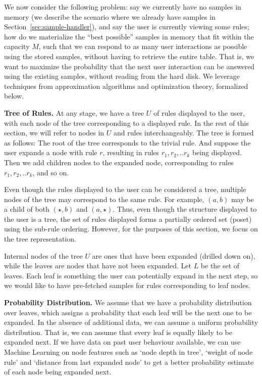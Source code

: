 \documentclass[10pt,journal,compsoc]{IEEEtran}
\newcounter{prob}
\newcommand{\stitle}[1]{\vspace{0.5em}\noindent\textbf{#1}}
\begin{document}
{We now consider the following problem: say we currently have no
samples in memory (we describe the scenario where we already have samples in Section~\ref{sec:sample-handler}), 
and say the user is currently viewing some rules; how do we
materialize the ``best possible'' samples in memory that fit within the capacity $M$,
such that we can respond to as many user interactions as possible using the stored samples,
without having to retrieve the entire table.
That is, we want to maximize the probability that the next user interaction
can be answered using the existing samples, without reading from the hard disk. 
We leverage techniques from approximation algorithms and optimization theory, formalized
below.


\stitle{Tree of Rules.}
At any stage, we have a tree $U$ of rules displayed to the user, 
with each node of the tree corresponding to a displayed rule. 
In the rest of this section, we will refer to nodes in $U$ and rules interchangeably.
The tree is formed as follows: The root of the tree corresponds to the trivial rule. 
And suppose the user expands a node with rule $r$, resulting in rules $r_1, r_2, .. r_k$ being displayed. 
Then we add children nodes to the expanded node, corresponding to rules $r_1, r_2, .. r_k$, and so on.

Even though the rules displayed to the user can be considered a tree, 
multiple nodes of the tree may correspond to the same rule. 
For example, $(a, b)$ may be a child of both $(\star, b)$ and $(a, \star)$.
Thus, even though the structure displayed to the user is a tree, 
the set of rules displayed forms a partially ordered set (poset) using the sub-rule ordering. 
However, for the purposes of this section, we focus on the tree representation.


Internal nodes of the tree $U$ are ones that have been expanded (drilled down on), 
while the leaves are nodes that have not been expanded. 
Let $L$ be the set of leaves. 
Each leaf is something the user can potentially expand in the next step, so we would like to have pre-fetched samples for rules corresponding to leaf nodes.

\stitle{Probability Distribution.} 
We assume that we have a probability distribution over leaves, which assigns a probability that each leaf will be the next one to be expanded. In the absence of additional data, we can assume a uniform probability distribution. That is, we can assume that every leaf is equally likely to be expanded next. If we have data on past user behaviour available, we can use Machine Learning on node features such as `node depth in tree', `weight of node rule' and `distance from last expanded node' to get a better probability estimate of each node being expanded next. 


}
\end{document}
